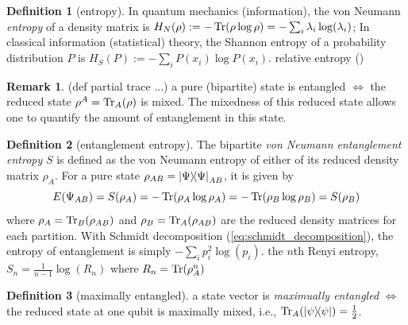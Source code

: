 \documentclass[
10pt,
aps,
pra,
linenumbers,
floatfix,
]{revtex4-2}
\theoremstyle{plain}
\theoremstyle{definition}
\newtheorem{definition}{Definition}
\newtheorem{remark}{Remark}
\newcommand{\dm}{\rho}
\begin{document}
\begin{definition}[entropy]\label{def:entropy}
	In quantum mechanics (information), the von Neumann \emph{entropy} of a density matrix is $H_N(\dm): = -\Tr(\dm \log \dm)=-\sum_i\lambda_i\log(\lambda_i)$;
	In classical information (statistical) theory, the Shannon entropy of a probability distribution $P$ is  $H_S(P):= -\sum_i P(x_i) \log P(x_i)$.
	relative entropy ()
\end{definition}
\begin{remark}
	(def partial trace ...)
	a pure (bipartite) state is entangled $\iff$ the reduced state $\dm^A=\Tr_A(\dm)$ is mixed.
	The mixedness of this reduced state allows one to quantify the amount of entanglement in this state.
\end{remark}
\begin{definition}[entanglement entropy]\label{def:entanglement_entropy}
	The bipartite \emph{von Neumann entanglement entropy} $S$
	is defined as the von Neumann entropy of either of
	its reduced density matrix $\dm_A$.
	For a pure state $\dm_{AB}=\op{\Psi}{\Psi}_{AB}$,
	it is given by
	\begin{equation}
		E(\Psi_{AB}) 
		= S(\dm_A)
		= -\Tr(\dm_A \log \dm_A)
		= -\Tr(\dm_B \log \dm_B)
		= S(\dm_B)
	\end{equation}
	where $\dm_A= \Tr_B(\dm_{AB})$ and $\dm_B = \Tr_A(\dm_{AB})$ 
	are the reduced density matrices for each partition.
	With Schmidt decomposition (\cref{eq:schmidt_decomposition}), the entropy of entanglement is simply $-\sum_ip_i^2\log(p_i)$.
	the $n$th Renyi entropy,
	$S_n = \frac{1}{n-1} \log (R_n)$
	where $R_n = \Tr(\dm^n_A)$
\end{definition}
\begin{definition}[maximally entangled]
	a state vector is \emph{maximually entangled} $\iff$ the reduced state at one qubit is maximally mixed, i.e.,
	$\Tr_A(\op{\psi})=\frac{1}{2}$.
\end{definition}
\end{document}

